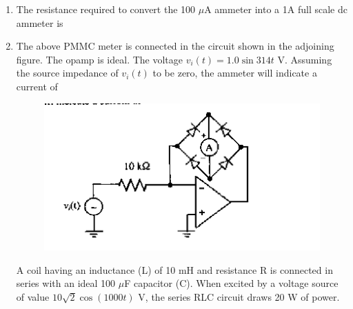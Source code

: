 \documentclass[journal,12pt,onecolumn]{IEEEtran}
\theoremstyle{remark}
\begin{document}
\begin{enumerate}
\item The resistance required to convert the 100 $\mu$A ammeter into a 1A full scale dc ammeter is

\hfill{}
\begin{enumerate} 
 \end{enumerate}

\item The above PMMC meter is connected in the circuit shown in the adjoining figure. The opamp is ideal. The voltage $v_i(t) = 1.0 \sin 314t$ V. Assuming the source impedance of $v_i(t)$ to be zero, the ammeter will indicate a current of
\begin{figure}[h]
    \centering
    \includegraphics[scale=0.75]{q51}
    \caption*{}
    \label{fig:placeholder}
\end{figure}

\hfill{}\begin{enumerate}  \end{enumerate}

A coil having an inductance (L) of 10 mH and resistance R is connected in series with an ideal 100 $\mu$F capacitor (C). When excited by a voltage source of value $10\sqrt{2} \cos(1000t)$ V, the series RLC circuit draws 20 W of power.


\end{enumerate}
\end{document}
